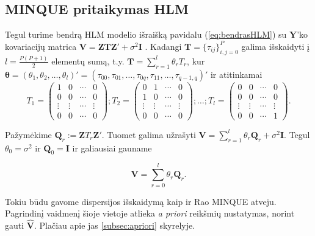 \documentclass[12pt,a4paper]{article}
\begin{document}
\subsection{MINQUE pritaikymas HLM}
Tegul turime bendrą HLM modelio išraišką pavidalu (\ref{eq:bendrasHLM}) su $\mathbf{Y}$'ko kovariacijų matrica $\mathbf{V}=\mathbf{ZTZ'}+\sigma^2\mathbf{I}$ . Kadangi $\mathbf{T}=\{\tau_{ij}\}^P_{i,j=0}$ galima išskaidyti į $l=\frac{P(P+1)}{2}$ elementų sumą, t.y.
$\mathbf{T}=\sum^l_{r=1}\theta_rT_r$, kur $\boldsymbol{\theta} = (\theta_1,\theta_2,\dots,\theta_l)'=(\tau_{00}, \tau_{01}, \dots, \tau_{0q}, \tau_{11},\dots, \tau_{q-1,q})'$ ir atitinkamai
\small
\[
T_1=
\begin{pmatrix}
1&0&\cdots&0 \\
0&0&\cdots&0 \\
\vdots&\vdots& \cdots &\vdots \\
0&0&\cdots&0
\end{pmatrix};
T_2=
\begin{pmatrix}
0&1&\cdots&0 \\
1&0&\cdots&0 \\
\vdots&\vdots& \cdots &\vdots \\
0&0&\cdots&0
\end{pmatrix};
\dots;
T_l=
\begin{pmatrix}
0&0&\cdots&0 \\
0&0&\cdots&0 \\
\vdots&\vdots& \cdots &\vdots \\
0&0&\cdots&1
\end{pmatrix}.
\]

Pažymėkime $\mathbf{Q}_r:= \mathbf{Z}T_r\mathbf{Z'}$. Tuomet galima užrašyti $\mathbf{V}=\sum^l_{r=1}\theta_r\mathbf{Q}_r+\sigma^2 \mathbf{I}$. Tegul $\theta_0 = \sigma^2$ ir $\mathbf{Q}_0=\mathbf{I}$ ir galiausiai gauname

\begin{equation}
\mathbf{V}=\sum^l_{r=0} \theta_r\mathbf{Q}_r.
\end{equation}

Tokiu būdu gavome dispersijos išskaidymą kaip ir Rao MINQUE atveju. Pagrindinį vaidmenį šioje vietoje atlieka \textit{a priori} reikšmių nustatymas, norint gauti $\mathbf{\hat{V}}$. Plačiau apie jas \ref{subsec:apriori} skyrelyje. 
\end{document}
